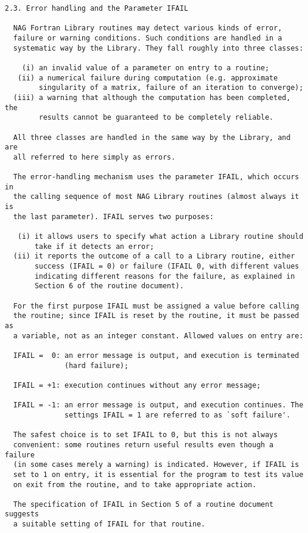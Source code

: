 \begin{verbatim}
2.3. Error handling and the Parameter IFAIL
 
  NAG Fortran Library routines may detect various kinds of error,
  failure or warning conditions. Such conditions are handled in a
  systematic way by the Library. They fall roughly into three classes:
 
    (i) an invalid value of a parameter on entry to a routine;
   (ii) a numerical failure during computation (e.g. approximate
        singularity of a matrix, failure of an iteration to converge);
  (iii) a warning that although the computation has been completed, the
        results cannot be guaranteed to be completely reliable.
 
  All three classes are handled in the same way by the Library, and are
  all referred to here simply as errors.
 
  The error-handling mechanism uses the parameter IFAIL, which occurs in
  the calling sequence of most NAG Library routines (almost always it is
  the last parameter). IFAIL serves two purposes:
 
   (i) it allows users to specify what action a Library routine should
       take if it detects an error;
  (ii) it reports the outcome of a call to a Library routine, either
       success (IFAIL = 0) or failure (IFAIL 0, with different values
       indicating different reasons for the failure, as explained in
       Section 6 of the routine document).
 
  For the first purpose IFAIL must be assigned a value before calling
  the routine; since IFAIL is reset by the routine, it must be passed as
  a variable, not as an integer constant. Allowed values on entry are:
 
  IFAIL =  0: an error message is output, and execution is terminated
              (hard failure);
 
  IFAIL = +1: execution continues without any error message;
 
  IFAIL = -1: an error message is output, and execution continues. The
              settings IFAIL = 1 are referred to as `soft failure'.
 
  The safest choice is to set IFAIL to 0, but this is not always
  convenient: some routines return useful results even though a failure
  (in some cases merely a warning) is indicated. However, if IFAIL is
  set to 1 on entry, it is essential for the program to test its value
  on exit from the routine, and to take appropriate action.
 
  The specification of IFAIL in Section 5 of a routine document suggests
  a suitable setting of IFAIL for that routine.
 

\end{verbatim}
